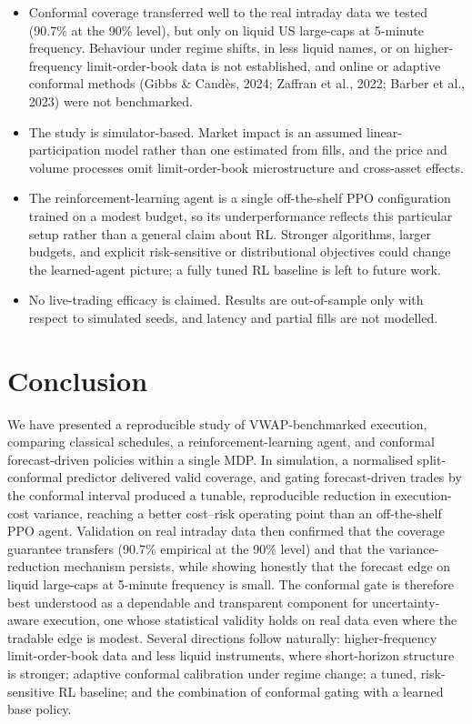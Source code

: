 \begin{itemize}
\item
  Conformal coverage transferred well to the real intraday data we
  tested (90.7\% at the 90\% level), but only on liquid US large-caps at
  5-minute frequency. Behaviour under regime shifts, in less liquid
  names, or on higher-frequency limit-order-book data is not
  established, and online or adaptive conformal methods (Gibbs \&
  Candès, 2024; Zaffran et al., 2022; Barber et al., 2023) were not
  benchmarked.
\item
  The study is simulator-based. Market impact is an assumed
  linear-participation model rather than one estimated from fills, and
  the price and volume processes omit limit-order-book microstructure
  and cross-asset effects.
\item
  The reinforcement-learning agent is a single off-the-shelf PPO
  configuration trained on a modest budget, so its underperformance
  reflects this particular setup rather than a general claim about RL.
  Stronger algorithms, larger budgets, and explicit risk-sensitive or
  distributional objectives could change the learned-agent picture; a
  fully tuned RL baseline is left to future work.
\item
  No live-trading efficacy is claimed. Results are out-of-sample only
  with respect to simulated seeds, and latency and partial fills are not
  modelled.
\end{itemize}

\section{Conclusion}

We have presented a reproducible study of VWAP-benchmarked execution,
comparing classical schedules, a reinforcement-learning agent, and
conformal forecast-driven policies within a single MDP. In simulation, a
normalised split-conformal predictor delivered valid coverage, and
gating forecast-driven trades by the conformal interval produced a
tunable, reproducible reduction in execution-cost variance, reaching a
better cost--risk operating point than an off-the-shelf PPO agent.
Validation on real intraday data then confirmed that the coverage
guarantee transfers (90.7\% empirical at the 90\% level) and that the
variance-reduction mechanism persists, while showing honestly that the
forecast edge on liquid large-caps at 5-minute frequency is small. The
conformal gate is therefore best understood as a dependable and
transparent component for uncertainty-aware execution, one whose
statistical validity holds on real data even where the tradable edge is
modest. Several directions follow naturally: higher-frequency
limit-order-book data and less liquid instruments, where short-horizon
structure is stronger; adaptive conformal calibration under regime
change; a tuned, risk-sensitive RL baseline; and the combination of
conformal gating with a learned base policy.

